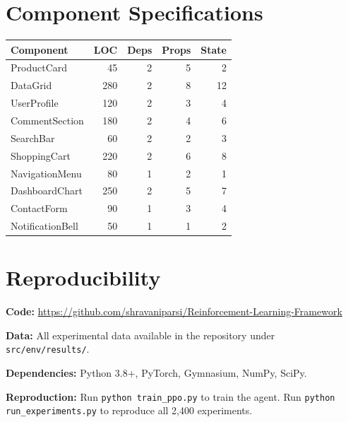 \documentclass[10pt,twocolumn]{article}
\begin{document}
\section{Component Specifications}

\begin{table}[h]
\centering
\small
\begin{tabular}{lrrrr}
\toprule
\textbf{Component} & \textbf{LOC} & \textbf{Deps} & \textbf{Props} & \textbf{State} \\
\midrule
ProductCard & 45 & 2 & 5 & 2 \\
DataGrid & 280 & 2 & 8 & 12 \\
UserProfile & 120 & 2 & 3 & 4 \\
CommentSection & 180 & 2 & 4 & 6 \\
SearchBar & 60 & 2 & 2 & 3 \\
ShoppingCart & 220 & 2 & 6 & 8 \\
NavigationMenu & 80 & 1 & 2 & 1 \\
DashboardChart & 250 & 2 & 5 & 7 \\
ContactForm & 90 & 1 & 3 & 4 \\
NotificationBell & 50 & 1 & 1 & 2 \\
\bottomrule
\end{tabular}
\end{table}

\section{Reproducibility}

\textbf{Code:} \url{https://github.com/shravaniparsi/Reinforcement-Learning-Framework}

\textbf{Data:} All experimental data available in the repository under \texttt{src/env/results/}.

\textbf{Dependencies:} Python 3.8+, PyTorch, Gymnasium, NumPy, SciPy.

\textbf{Reproduction:} Run \texttt{python train\_ppo.py} to train the agent. Run \texttt{python run\_experiments.py} to reproduce all 2,400 experiments.
\end{document}
